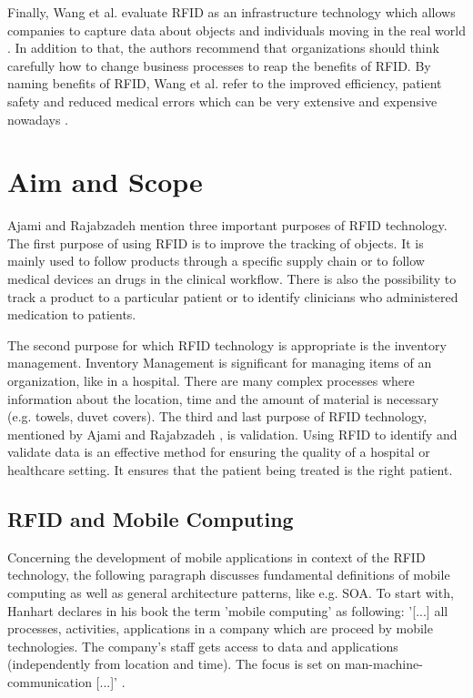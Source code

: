Finally, Wang et al. evaluate RFID as an infrastructure technology which allows companies to capture data about objects and individuals moving in the real world \cite[p.7]{casestudy}. In addition to that, the authors recommend that organizations should think carefully how to change business processes to reap the benefits of RFID. By naming benefits of RFID, Wang et al. refer to the improved efficiency, patient safety and reduced medical errors which can be very extensive and expensive nowadays \cite{casestudy}.

\section{Aim and Scope} \label{aim}

Ajami and Rajabzadeh \cite{ncbi} mention three important purposes of RFID technology. The first purpose of using RFID is to improve the tracking of objects. It is mainly used to follow products through a specific supply chain or to follow medical devices an drugs in the clinical workflow. There is also the possibility to track a product to a particular patient or to identify clinicians who administered medication to patients.

The second purpose for which RFID technology is appropriate is the inventory management. Inventory Management is significant for managing items of an organization, like in a hospital. There are many complex processes where information about the location, time and the amount of material is necessary (e.g. towels, duvet covers).
The third and last purpose of RFID technology, mentioned by Ajami and Rajabzadeh \cite{ncbi}, is validation. Using RFID to identify and validate data is an effective method for ensuring the quality of a hospital or healthcare setting. It ensures that the patient being treated is the right patient.

\subsection{RFID and Mobile Computing}

Concerning the development of mobile applications in context of the RFID technology, the following paragraph discusses fundamental definitions of mobile computing as well as general architecture patterns, like e.g. \ac{SOA}. 
To start with, Hanhart declares in his book \cite[p.9 ff.]{mobile} the term 'mobile computing' as following: '[...] all processes, activities, applications in a company which are proceed by mobile technologies. The company's staff gets access to data and applications (independently from location and time). The focus is set on man-machine-communication [...]' \cite[p.9 ff.]{mobile}. 

